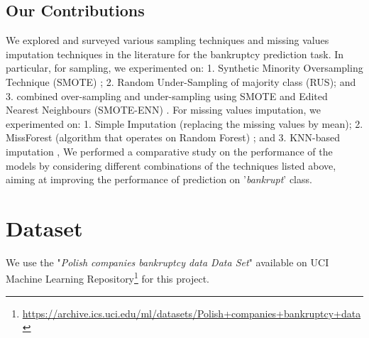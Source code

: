 \documentclass[11pt,a4paper]{article}
\begin{document}
\subsection{Our Contributions}
We explored and surveyed various sampling techniques and missing values imputation techniques in the literature for the bankruptcy prediction task. In particular, for sampling, we experimented on: 1. Synthetic Minority Oversampling Technique (SMOTE) \cite{Chawla_2002}; 2. Random Under-Sampling of majority class (RUS); and 3. combined over-sampling and under-sampling using SMOTE and Edited Nearest Neighbours (SMOTE-ENN) \cite{Batista2004ASO}. For missing values imputation, we experimented on: 1. Simple Imputation (replacing the missing values by mean); 2. MissForest (algorithm that operates on Random Forest) \cite{Stekhoven_2011}; and 3. KNN-based imputation \cite{mani2003knn}, We performed a comparative study on the performance of the models by considering different combinations of the techniques listed above, aiming at improving the performance of prediction on '\textit{bankrupt}' class.

\section{Dataset}
\label{sec::dataset}
We use the "\textit{Polish companies bankruptcy data Data Set}" available on UCI Machine Learning Repository\footnote{ \url{https://archive.ics.uci.edu/ml/datasets/Polish+companies+bankruptcy+data}} for this project.
\end{document}
